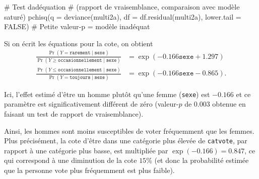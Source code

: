 \documentclass[
  11pt,
  letterpaper,
]{scrbook}
\newenvironment{Shaded}{\begin{snugshade}}{\end{snugshade}}
\newcommand{\AttributeTok}[1]{\textcolor[rgb]{0.40,0.45,0.13}{#1}}
\newcommand{\CommentTok}[1]{\textcolor[rgb]{0.37,0.37,0.37}{#1}}
\newcommand{\ConstantTok}[1]{\textcolor[rgb]{0.56,0.35,0.01}{#1}}
\newcommand{\FunctionTok}[1]{\textcolor[rgb]{0.28,0.35,0.67}{#1}}
\newcommand{\NormalTok}[1]{\textcolor[rgb]{0.00,0.23,0.31}{#1}}
\theoremstyle{definition}
\theoremstyle{remark}
\begin{document}
\begin{Shaded}
\begin{Highlighting}[]
\CommentTok{\# Test d\textquotesingle{}adéquation }
\CommentTok{\# (rapport de vraisemblance, comparaison avec modèle saturé)}
\FunctionTok{pchisq}\NormalTok{(}\AttributeTok{q =} \FunctionTok{deviance}\NormalTok{(multi2a),}
       \AttributeTok{df =} \FunctionTok{df.residual}\NormalTok{(multi2a),}
       \AttributeTok{lower.tail =} \ConstantTok{FALSE}\NormalTok{)}
\CommentTok{\# Petite valeur{-}p = modèle inadéquat}
\end{Highlighting}
\end{Shaded}

\begin{table}

\caption{\label{tbl-ordered-logistic}Tableau des estimations des
coefficients du modèle pour réponses ordinales pour la régression
logistique à cotes proportionnelles avec sexe.}


\end{table}%

Si on écrit les équations pour la cote, on obtient \begin{align*}
\frac{\Pr(Y = \texttt{rarement} \mid \texttt{sexe})}{\Pr(Y \geq \texttt{occasionnellement} \mid \texttt{sexe})} &= \exp(-0.166\texttt{sexe} + 1.297) \\ 
\frac{\Pr(Y \leq \texttt{occasionnellement} \mid \texttt{sexe})}{\Pr(Y = \texttt{toujours} \mid \texttt{sexe})} &= \exp(-0.166\texttt{sexe} - 0.865).
\end{align*}

Ici, l'effet estimé d'être un homme plutôt qu'une femme (\texttt{sexe})
est \(-0.166\) et ce paramètre est significativement différent de zéro
(valeur-\(p\) de \(0.003\) obtenue en faisant un test de rapport de
vraisemblance).

Ainsi, les hommes sont moins susceptibles de voter fréquemment que les
femmes. Plus précisément, la cote d'être dans une catégorie plus élevée
de \texttt{catvote}, par rapport à une catégorie plus basse, est
multipliée par \(\exp(-0.166) = 0.847\), ce qui correspond à une
diminution de la cote \(15\)\% (et donc la probabilité estimée que la
personne vote plus fréquemment est plus faible).
\end{document}
